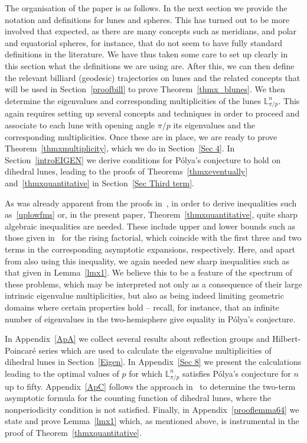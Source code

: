 \documentclass[11pt,a4paper,times]{amsart}
\theoremstyle{plain}
\theoremstyle{definition}
\numberwithin{equation}{section}
\newcommand{\lune}[2]{\mathbb{L}^{#1}_{#2}}
\begin{document}
The organisation of the paper is as follows. In the next section we provide the notation and definitions for lunes and spheres.
This has turned out to be more involved that expected, as there are many concepts such as meridians, and  polar and equatorial spheres,
for instance, that do not seem to have fully standard definitions in the literature. We have thus taken some care to set up clearly
in this section what the definitions we are using are. After this, we can then define the relevant billiard (geodesic) trajectories
on lunes and the related concepts that will be used in Section~\ref{proofbill} to prove Theorem~\ref{thmx_blunes}. We then
determine the eigenvalues and corresponding multiplicities of the lunes $\lune{n}{\pi/p}$. This again requires setting up several concepts
and techniques in order to proceed and associate to each lune with opening angle $\pi/p$ its eigenvalues and the corresponding
multiplicities. Once these are in place, we are ready to prove Theorem~\ref{thmxmultiplicity}, which we do in Section~\ref{Sec 4}.
In Section~\ref{introEIGEN} we derive conditions for P\'{o}lya's conjecture to hold on dihedral lunes, leading to the proofs
of Theorems~\ref{thmxeventually} and~\ref{thmxquantitative} in Section~\ref{Sec Third term}. 

As was already apparent from the proofs in~\cite{fms}, in order to derive inequalities such as~\eqref{uplowfms} or, in the
present paper, Theorem~\ref{thmxquantitative}, quite sharp algebraic inequalities are needed. These include upper and lower
bounds such as those given in~\cite[Lemma~A.1]{fms} for the rising factorial, which coincide with the first three and two terms in
the corresponding asymptotic expansions, respectively. Here, and apart from also using this inequality, we again needed new sharp
inequalities such as that given in Lemma~\ref{lmx1}. We believe this to be a feature of the spectrum of these problems, which may be
interpreted not only as a consequence of their large intrinsic eigenvalue multiplicities, but also as being indeed limiting geometric
domains where certain properties hold -- recall, for instance, that an infinite number of eigenvalues in the two-hemisphere give equality
in P\'{o}lya's conjecture.


In Appendix~\ref{ApA} we collect several results about reflection groups and Hilbert-Poincar\'{e} series which are used to calculate
the eigenvalue multiplicities of dihedral lunes in Section~\ref{Eigen}. In Appendix~\ref{Sec 8} we present the calculations leading
to the optimal values of $p$ for which $\lune{n}{\pi/p}$ satisfies P\'{o}lya's conjecture for $n$ up to fifty. Appendix~\ref{ApC}
follows the approach in~\cite{sava} to determine the two-term asymptotic formula for the counting function of dihedral lunes, where
the nonperiodicity condition is not satisfied. Finally, in Appendix~\ref{prooflemma64} we state and prove Lemma~\ref{lmx1}
which, as mentioned above, is instrumental in the proof of Theorem~\ref{thmxquantitative}.
\end{document}
